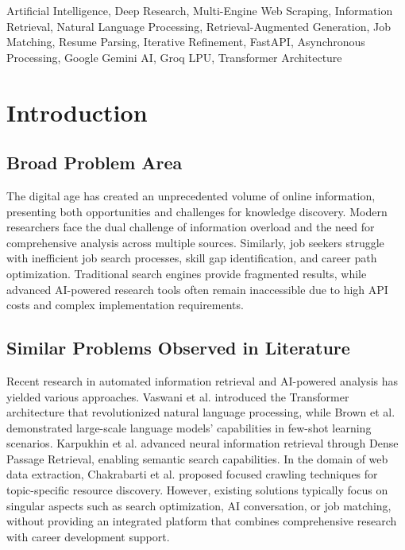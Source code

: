 \documentclass[conference]{IEEEtran}
\begin{document}
\begin{IEEEkeywords}
Artificial Intelligence, Deep Research, Multi-Engine Web Scraping, Information Retrieval, Natural Language Processing, Retrieval-Augmented Generation, Job Matching, Resume Parsing, Iterative Refinement, FastAPI, Asynchronous Processing, Google Gemini AI, Groq LPU, Transformer Architecture
\end{IEEEkeywords}

\section{Introduction}

\subsection{Broad Problem Area}
The digital age has created an unprecedented volume of online information, presenting both opportunities and challenges for knowledge discovery. Modern researchers face the dual challenge of information overload and the need for comprehensive analysis across multiple sources. Similarly, job seekers struggle with inefficient job search processes, skill gap identification, and career path optimization. Traditional search engines provide fragmented results, while advanced AI-powered research tools often remain inaccessible due to high API costs and complex implementation requirements.

\subsection{Similar Problems Observed in Literature}
Recent research in automated information retrieval and AI-powered analysis has yielded various approaches. Vaswani et al. \cite{ref1} introduced the Transformer architecture that revolutionized natural language processing, while Brown et al. \cite{ref2} demonstrated large-scale language models' capabilities in few-shot learning scenarios. Karpukhin et al. \cite{ref3} advanced neural information retrieval through Dense Passage Retrieval, enabling semantic search capabilities. In the domain of web data extraction, Chakrabarti et al. \cite{ref4} proposed focused crawling techniques for topic-specific resource discovery. However, existing solutions typically focus on singular aspects such as search optimization, AI conversation, or job matching, without providing an integrated platform that combines comprehensive research with career development support.
\end{document}
